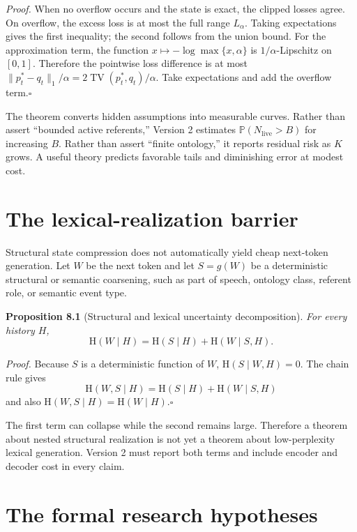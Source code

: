 \documentclass[11pt]{article}
\begin{document}
\emph{Proof.} When no overflow occurs and the state is exact, the clipped losses agree. On overflow, the excess loss is at most the full range \(L_\alpha\). Taking expectations gives the first inequality; the second follows from the union bound. For the approximation term, the function \(x\mapsto-\log\max\{x,\alpha\}\) is \(1/\alpha\)-Lipschitz on \([0,1]\). Therefore the pointwise loss difference is at most \(\|p_t^*-q_t\|_1/\alpha=2\operatorname{TV}(p_t^*,q_t)/\alpha\). Take expectations and add the overflow term.\hfill\(\square\)

The theorem converts hidden assumptions into measurable curves. Rather than assert ``bounded active referents,'' Version 2 estimates \(\mathbb{P}(N_{\mathrm{live}}>B)\) for increasing \(B\). Rather than assert ``finite ontology,'' it reports residual risk as \(K\) grows. A useful theory predicts favorable tails and diminishing error at modest cost.

\section{The lexical-realization barrier}\label{the-lexical-realization-barrier}

Structural state compression does not automatically yield cheap next-token generation. Let \(W\) be the next token and let \(S=g(W)\) be a deterministic structural or semantic coarsening, such as part of speech, ontology class, referent role, or semantic event type.

\label{prop:lexical-decomp}
\textbf{Proposition 8.1} (Structural and lexical uncertainty decomposition). \emph{For every history \(H\), \[\mathrm{H}(W\mid H)
=
\mathrm{H}(S\mid H)+\mathrm{H}(W\mid S,H).\]}

\emph{Proof.} Because \(S\) is a deterministic function of \(W\), \(\mathrm{H}(S\mid W,H)=0\). The chain rule gives \[\mathrm{H}(W,S\mid H)=\mathrm{H}(S\mid H)+\mathrm{H}(W\mid S,H)\] and also \(\mathrm{H}(W,S\mid H)=\mathrm{H}(W\mid H)\).\hfill\(\square\)

The first term can collapse while the second remains large. Therefore a theorem about nested structural realization is not yet a theorem about low-perplexity lexical generation. Version 2 must report both terms and include encoder and decoder cost in every claim.

\section{The formal research hypotheses}\label{the-formal-research-hypotheses}
\end{document}
